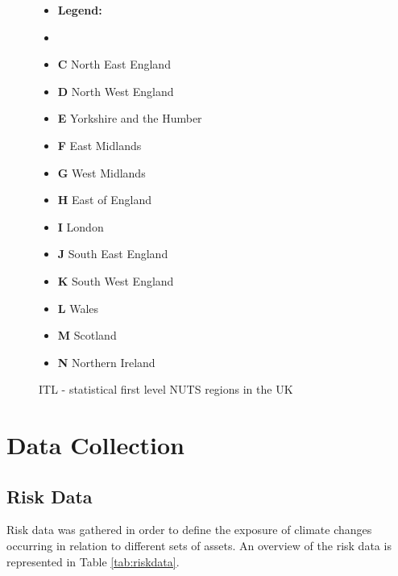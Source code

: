 \documentclass[10pt,a4paper]{article}
\begin{document}
\begin{figure}[H]\hspace{1.25cm}
  \begin{minipage}{.5\textwidth}\hspace{.75cm}
      \resizebox{0.8\textwidth}{!}{}
  \end{minipage}%
  \begin{minipage}{.5\textwidth}
    \vspace{-1cm}
    \begin{itemize}
            \item[] \hspace{-.5cm}\textbf{Legend:}
            \item[]
            \item \textbf{C} North East England
            \item \textbf{D} North West England
            \item \textbf{E} Yorkshire and the Humber
            \item \textbf{F} East Midlands
            \item \textbf{G} West Midlands
            \item \textbf{H} East of England
            \item \textbf{I} London
            \item \textbf{J} South East England
            \item \textbf{K} South West England
            \item \textbf{L} Wales
            \item \textbf{M} Scotland
            \item \textbf{N} Northern Ireland
        \end{itemize}
    \end{minipage}
    \vspace{.25cm}
    \caption{ITL - statistical first level NUTS regions in the UK 
    \label{fig:ITLUk}
    \cite{zotero-176}}
\end{figure}
\newpage
\section{Data Collection} \label{sec:data}

\subsection{Risk Data}
Risk data was gathered in order to define the exposure of climate changes occurring in relation to different sets of assets. An overview of the risk data is represented in Table \ref{tab:riskdata}.
\end{document}
